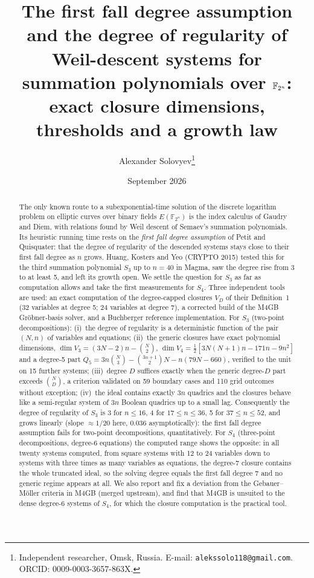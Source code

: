 \documentclass[11pt,a4paper]{article}
\title{The first fall degree assumption and the degree of regularity of Weil-descent systems for summation polynomials over $\F_{2^n}$:\\
exact closure dimensions, thresholds and a growth law}
\author{Alexander Solovyev\thanks{Independent researcher, Omsk, Russia. E-mail: \texttt{alekssolo118@gmail.com}. ORCID: 0009-0003-3657-863X.}}
\date{September 2026}
\theoremstyle{remark}\newtheorem{remark}{Remark}
\newcommand{\F}{\mathbb{F}}
\begin{document}
\maketitle

\begin{abstract}
The only known route to a subexponential-time solution of the discrete logarithm problem on elliptic curves over binary fields $E(\F_{2^n})$ is the index calculus of Gaudry and Diem, with relations found by Weil descent of Semaev's summation polynomials. Its heuristic running time rests on the \emph{first fall degree assumption} of Petit and Quisquater: that the degree of regularity of the descended systems stays close to their first fall degree as $n$ grows. Huang, Kosters and Yeo (CRYPTO 2015) tested this for the third summation polynomial $S_3$ up to $n=40$ in Magma, saw the degree rise from 3 to at least 5, and left its growth open. We settle the question for $S_3$ as far as computation allows and take the first measurements for $S_4$. Three independent tools are used: an exact computation of the degree-capped closures $V_D$ of their Definition~1 (32 variables at degree 5; 24 variables at degree 7), a corrected build of the M4GB Gröbner-basis solver, and a Buchberger reference implementation. For $S_3$ (two-point decompositions): (i)~the degree of regularity is a deterministic function of the pair $(N,n)$ of variables and equations; (ii)~the generic closures have exact polynomial dimensions, $\dim V_3=(3N-2)n-\binom N2$, $\dim V_4=\tfrac12[3N(N+1)n-171n-9n^2]$ and a degree-5 part $Q_5=3n\binom N3-\binom{3n+1}2N-n(79N-660)$, verified to the unit on 15 further systems; (iii)~degree $D$ suffices exactly when the generic degree-$D$ part exceeds $\binom ND$, a criterion validated on 59 boundary cases and 110 grid outcomes without exception; (iv)~the ideal contains exactly $3n$ quadrics and the closures behave like a semi-regular system of $3n$ Boolean quadrics up to a small lag. Consequently the degree of regularity of $S_3$ is 3 for $n\le16$, 4 for $17\le n\le36$, 5 for $37\le n\le52$, and grows linearly (slope $\approx1/20$ here, $0.036$ asymptotically): the first fall degree assumption fails for two-point decompositions, quantitatively. For $S_4$ (three-point decompositions, degree-6 equations) the computed range shows the opposite: in all twenty systems computed, from square systems with 12 to 24 variables down to systems with three times as many variables as equations, the degree-7 closure contains the whole truncated ideal, so the solving degree equals the first fall degree 7 and no generic regime appears at all. We also report and fix a deviation from the Gebauer--Möller criteria in M4GB (merged upstream), and find that M4GB is unsuited to the dense degree-6 systems of $S_4$, for which the closure computation is the practical tool.
\end{abstract}
\end{document}

